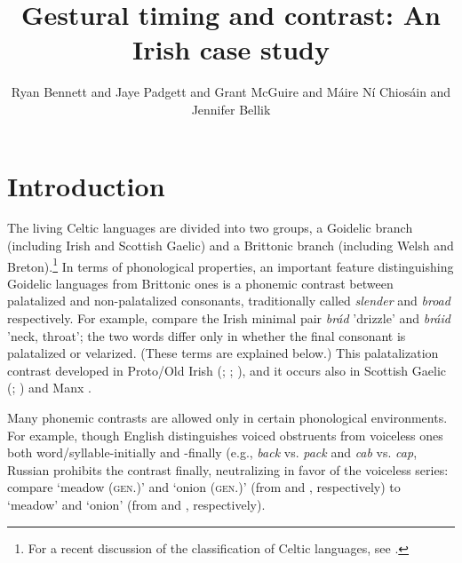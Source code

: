 \documentclass[output=paper,colorlinks,citecolor=brown]{langscibook}
\author{Ryan Bennett\affiliation{University of California, Santa Cruz} and
        Jaye Padgett\affiliation{University of California, Santa Cruz} and
        Grant McGuire\affiliation{University of California, Santa Cruz} and
        Máire Ní Chiosáin\affiliation{University College Dublin} and 
        Jennifer Bellik\affiliation{University of California, Santa Cruz} 
        }
\title{Gestural timing and contrast: An Irish case study}
\begin{document}
\maketitle


\section{Introduction}
The living Celtic languages are divided into two groups, a Goidelic branch (including Irish and Scottish Gaelic) and a Brittonic branch (including Welsh and Breton).\footnote{For a recent discussion of the classification of Celtic languages, see \citet{Eska2017_Celtic_phono}.} In terms of phonological properties, an important feature distinguishing Goidelic languages from Brittonic ones is a phonemic contrast between pala\-talized and non-palatalized consonants, traditionally called \textit{slender} and \textit{broad} respectively. For example, compare the Irish minimal pair \textit{brád}  'drizzle' and \textit{bráid}  'neck, throat'; the two words differ only in whether the final consonant is palatalized or velarized. (These terms are explained below.) This palatalization contrast developed in Proto/Old Irish (\cite{Green1973_Old_Irish_pal}; \cite{mccone:1996}; \cite{Stifter2017_Celtic_phono}), and it occurs also in Scottish Gaelic (\cite{ternes:2006}; \cite{Nance_OMaolalaigh2021_Sottish_Gaelic_JIPA}) and Manx \citep{Lewin:2019}.

Many phonemic contrasts are allowed only in certain phonological environments. For example, though English distinguishes voiced obstruents from voiceless ones both word\slash syllable\hyp initially and -finally (e.g., \textit{back}
vs. \textit{pack} and \textit{cab} vs. \textit{cap}, Russian prohibits the contrast finally, neutralizing in favor of the voiceless series: compare \ipa{[ˈlˠugˠə]} `meadow (\textsc{gen.})' and \ipa{[ˈlˠukˠə]} `onion (\textsc{gen.})' (from  and , respectively) to \ipa{[lˠukˠ]} `meadow' and \ipa{[lˠukˠ]} `onion' (from  and , respectively).  
\end{document}
